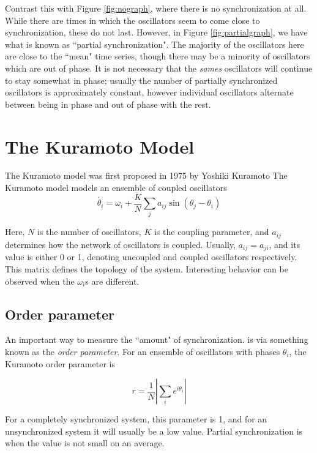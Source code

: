 \documentclass[12pt]{article}
\begin{document}
Contrast this with Figure \ref{fig:nograph}, where there is no synchronization at all. While there are times in which the oscillators seem to come close to synchronization, these do not last. However, in Figure \ref{fig:partialgraph}, we have what is known as ``partial synchronization". The majority of the oscillators here are close to the ``mean" time
 series, though there may be a minority of oscillators which are out of phase. It is not necessary that the \emph{sames} oscillators will continue to stay somewhat in phase; usually the number of partially synchronized oscillators is approximately constant, however individual oscillators alternate between being in phase and out of phase with the rest.



\section{The Kuramoto Model}
The Kuramoto model was first proposed in 1975 by Yoshiki Kuramoto\cite{kuramoto1975proceedings}
The Kuramoto model models an ensemble of coupled oscillators
$$\dot{\theta_i} = \omega_i + \frac{K}{N}\sum_j a_{ij}\sin(\theta_j - \theta_i) $$

Here, $N$ is the number of oscillators, $K$ is the coupling parameter, and $a_{ij}$ determines how the network of oscillators is coupled. Usually, $a_{ij}=a_{ji}$, and its value is either 0 or 1, denoting uncoupled and coupled oscillators respectively. This matrix defines the topology of the system. Interesting behavior can be observed when the $\omega_i$s are different.

\subsection{Order parameter}
An important way to measure the ``amount" of synchronization. is via something known as the \emph{order parameter}. For an ensemble of oscillators with phases $\theta_i$, the Kuramoto order parameter is 

$$r = \frac1{N}\left|\sum_i e^{i\theta_i}\right|$$

For a completely synchronized system, this parameter is 1, and for an unsynchronized system it will usually be a low value. Partial synchronization is when the value is not small on an average.
\end{document}
